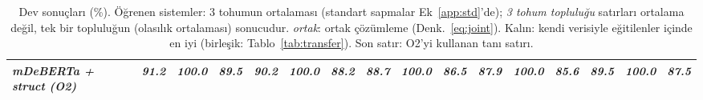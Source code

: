 \begin{table}[t]
{\begin{tabular}{lccccccccccccccc}
\midrule
\textit{mDeBERTa + struct (O2)} & \textit{91.2} & \textit{100.0} & \textit{89.5} & \textit{90.2} & \textit{100.0} & \textit{88.2} & \textit{88.7} & \textit{100.0} & \textit{86.5} & \textit{87.9} & \textit{100.0} & \textit{85.6} & \textit{89.5} & \textit{100.0} & \textit{87.5} \\
\bottomrule
\end{tabular}}
\caption{Dev sonuçları (\%). Öğrenen sistemler: 3 tohumun ortalaması (standart sapmalar Ek~\ref{app:std}'de); \emph{3 tohum topluluğu} satırları ortalama değil, tek bir topluluğun (olasılık ortalaması) sonucudur. \emph{ortak}: ortak çözümleme (Denk.~\ref{eq:joint}). Kalın: kendi verisiyle eğitilenler içinde en iyi (birleşik: Tablo~\ref{tab:transfer}). Son satır: O2'yi kullanan tanı satırı.}
\label{tab:main}
\end{table}
